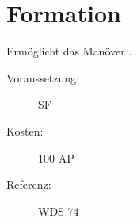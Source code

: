 \section{Formation}
\label{sf.formation}
Ermöglicht das Manöver .
\begin{description}
    \item[Voraussetzung:]
        SF 
    \item [Kosten:]
        100 AP
    \item [Referenz:]
        WDS 74
\end{description}
